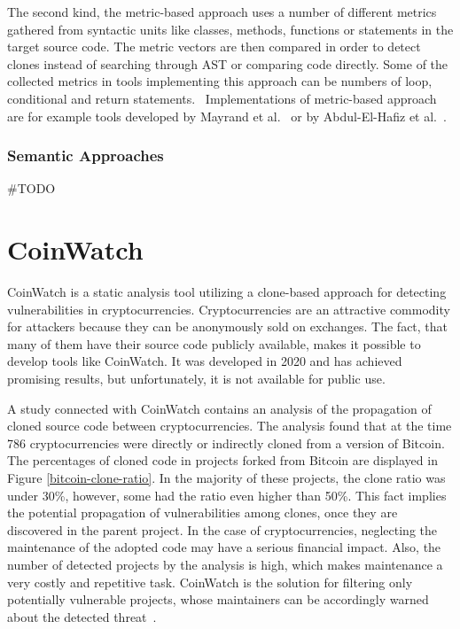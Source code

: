       The second kind, the metric-based approach uses a number of different metrics gathered from syntactic units
      like classes, methods, functions or statements in the target source code. The metric vectors are then compared
      in order to detect clones instead of searching through AST or comparing code directly. Some of the collected
      metrics in tools implementing this approach can be numbers of loop, conditional and return
      statements.~\cite{CloneDetectionTechniques, CodeClonesSurvey}
      Implementations of metric-based approach are for example tools developed by Mayrand et al.~\cite{MBMayrand}
      or by Abdul-El-Hafiz et al.~\cite{MDAbdul}.

      \subsubsection*{Semantic Approaches}
      \#TODO


  \section{CoinWatch}
    CoinWatch is a static analysis tool utilizing a clone-based approach for detecting vulnerabilities
    in cryptocurrencies. Cryptocurrencies are an attractive commodity for attackers because they can be
    anonymously sold on exchanges. The fact, that many of them have their source code publicly available,
    makes it possible to develop tools like CoinWatch. It was developed in 2020 and has achieved promising
    results, but unfortunately, it is not available for public use.

    A study connected with CoinWatch contains an analysis of the propagation of cloned source code between
    cryptocurrencies. The analysis found that at the time 786 cryptocurrencies were directly or indirectly
    cloned from a version of Bitcoin. The percentages of cloned code in projects forked from Bitcoin
    are displayed in Figure \ref{bitcoin-clone-ratio}. In the majority of these projects, the clone ratio was
    under 30\%, however, some had the ratio even higher than 50\%. This fact implies the potential propagation
    of vulnerabilities among clones, once they are discovered in the parent project. In the case of
    cryptocurrencies, neglecting the maintenance of the adopted code may have a serious financial impact.
    Also, the number of detected projects by the analysis is high, which makes maintenance a very costly
    and repetitive task. CoinWatch is the solution for filtering only potentially vulnerable projects,
    whose maintainers can be accordingly warned about the detected threat~\cite{CoinWatch}.

